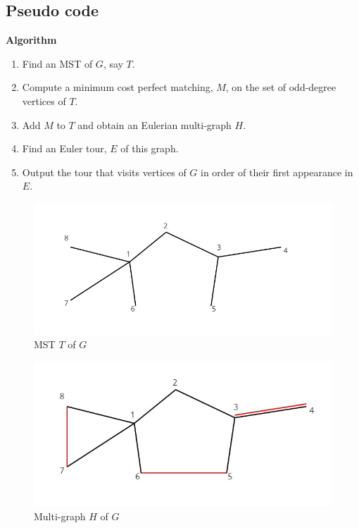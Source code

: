 \subsection{Pseudo code}
\textbf{Algorithm}
\begin{enumerate}
    \item{
        Find an MST of $G$, say $T$.        
    }
    \item {Compute a minimum cost perfect matching, $M$, on the set of odd-degree vertices of $T$.}
    \item {
        Add $M$ to $T$ and obtain an Eulerian multi-graph $H$.
    }
    \item {Find an Euler tour, $E$ of this graph.
    }
    \item {Output the tour that visits vertices of $G$ in order of their first appearance in $E$.}
\end{enumerate}
\begin{figure}[h]
    \centering
    \caption{MST $T$ of $G$}
    \includegraphics[scale=0.3]{1.jpg}
\end{figure}        
\begin{figure}[h]
    \centering
    \caption{Multi-graph $H$ of $G$}
    \includegraphics[scale=0.3]{2.jpg}
\end{figure}
